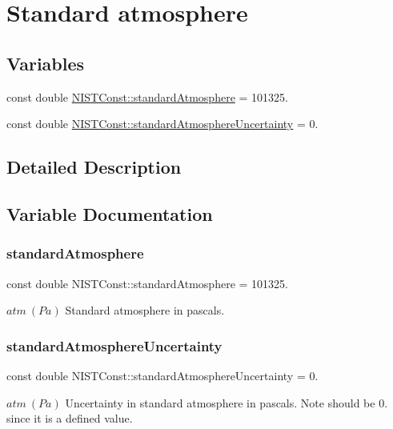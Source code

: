 \hypertarget{group___standard_atmosphere}{}\section{Standard atmosphere}
\label{group___standard_atmosphere}
\subsection*{Variables}
\begin{DoxyCompactItemize}
\item 
const double \hyperlink{group___standard_atmosphere_ga260e00232ff2d0d8a24bdbf7f6c87b4e}{N\+I\+S\+T\+Const\+::standard\+Atmosphere} = 101325.
\item 
const double \hyperlink{group___standard_atmosphere_ga784dc63051d7f1dca50f4f2843c8fbcf}{N\+I\+S\+T\+Const\+::standard\+Atmosphere\+Uncertainty} = 0.
\end{DoxyCompactItemize}


\subsection{Detailed Description}


\subsection{Variable Documentation}
\mbox{\label{group___standard_atmosphere_ga260e00232ff2d0d8a24bdbf7f6c87b4e}} 
\subsubsection{\texorpdfstring{standard\+Atmosphere}{standardAtmosphere}}
{\footnotesize\ttfamily const double N\+I\+S\+T\+Const\+::standard\+Atmosphere = 101325.}

$atm \ (Pa)$ Standard atmosphere in pascals. \mbox{\label{group___standard_atmosphere_ga784dc63051d7f1dca50f4f2843c8fbcf}} 
\subsubsection{\texorpdfstring{standard\+Atmosphere\+Uncertainty}{standardAtmosphereUncertainty}}
{\footnotesize\ttfamily const double N\+I\+S\+T\+Const\+::standard\+Atmosphere\+Uncertainty = 0.}

$atm \ (Pa)$ Uncertainty in standard atmosphere in pascals. Note should be 0. since it is a defined value. 